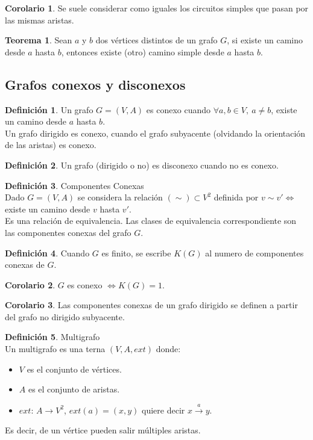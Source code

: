 \documentclass[10pt]{article}
\theoremstyle{definition}
\newtheorem{definition}{Definición}[section]
\newtheorem{theorem}{Teorema}[section]
\newtheorem{corollary}{Corolario}[theorem]
\begin{document}
\begin{corollary}
	Se suele considerar como iguales los circuitos simples que pasan por las mismas aristas.
\end{corollary}
\begin{theorem}
	Sean $a$ y $b$ dos vértices distintos de un grafo $G$, si existe un camino desde $a$ hasta $b$, entonces existe (otro) camino simple desde $a$ hasta $b$.
\end{theorem}
\newpage\subsection{Grafos conexos y disconexos}
\begin{definition}
	Un grafo $G=(V,A)$ es conexo cuando $\forall a,b\in V,\ a\neq b$, existe un camino desde $a$ hasta $b$.\\
	Un grafo dirigido es conexo, cuando el grafo subyacente (olvidando la orientación de las aristas) es conexo.
\end{definition}
\begin{definition}
	Un grafo (dirigido o no) es disconexo cuando no es conexo.
\end{definition}
\begin{definition}{Componentes Conexas}
	\\Dado $G=(V,A)$ se considera la relación $(\sim)\subset V^2$ definida por $v\sim v'\Leftrightarrow$ existe un camino desde $v$ hasta $v'$.\\Es una relación de equivalencia. Las clases de equivalencia correspondiente son las componentes conexas del grafo $G$.
\end{definition}
\begin{definition}
	Cuando $G$ es finito, se escribe $K(G)$ al numero de componentes conexas de $G$.
\end{definition}
\begin{corollary}
	$G$ es conexo $\Leftrightarrow K(G)=1$.
\end{corollary}
\begin{corollary}
	Las componentes conexas de un grafo dirigido se definen a partir del grafo no dirigido subyacente.
\end{corollary}
\begin{definition}{Multigrafo}
	\\Un multigrafo es una terna $(V,A,ext)$ donde:
	\begin{itemize}
		\item $V$ es el conjunto de vértices.
		\item $A$ es el conjunto de aristas.
		\item $ext$: $A\to V^2$, $ext(a)=(x,y)$ quiere decir $x\xrightarrow{a} y$.
	\end{itemize}
	Es decir, de un vértice pueden salir múltiples aristas.
\end{definition}
\end{document}
